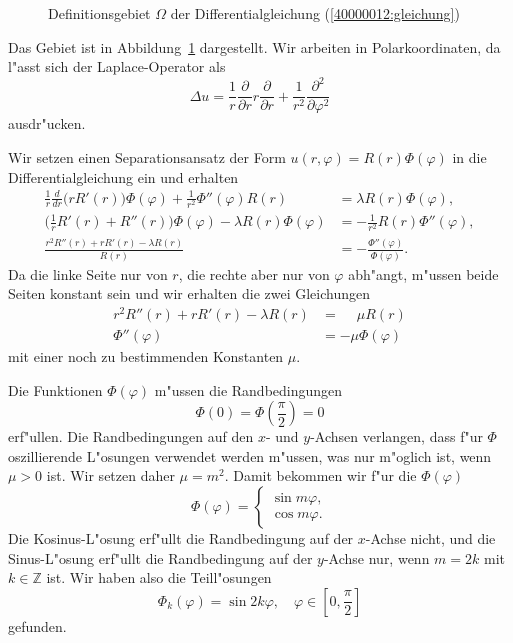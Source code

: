 \begin{loesung}
\begin{figure}
\centering
{}
\caption{Definitionsgebiet $\Omega$ der Differentialgleichung
(\ref{40000012:gleichung})
\label{40000012:gebiet}
}
\end{figure}
Das Gebiet ist in Abbildung~\ref{40000012:gebiet} dargestellt.
Wir arbeiten in Polarkoordinaten, da l"asst sich der Laplace-Operator als
\[
\Delta u
=
\frac1r\frac{\partial}{\partial r}r\frac{\partial}{\partial r}
+
\frac1{r^2}
\frac{\partial^2}{\partial\varphi^2}
\]
ausdr"ucken.
\begin{teilaufgaben}
\item
Wir setzen einen Separationsansatz der Form $u(r,\varphi)=R(r)\Phi(\varphi)$
in die Differentialgleichung ein und erhalten
\begin{align*}
\frac1r\frac{d}{dr}\bigl(rR'(r)\bigr)\Phi(\varphi)
+
\frac1{r^2}
\Phi''(\varphi)R(r)
&=
\lambda R(r)\Phi(\varphi),
\\
\biggl(\frac1rR'(r)+R''(r)\biggr)\Phi(\varphi)
- \lambda R(r)\Phi(\varphi)
&=
-
\frac1{r^2}
R(r)\Phi''(\varphi),
\\
\frac{r^2R''(r)+rR'(r)-\lambda R(r)}{R(r)}
&=
-\frac{\Phi''(\varphi)}{\Phi(\varphi)}.
\end{align*}
Da die linke Seite nur von $r$, die rechte aber nur von $\varphi$ abh"angt,
m"ussen beide Seiten konstant sein und wir
erhalten die zwei Gleichungen
\begin{align}
r^2R''(r)+rR'(r)-\lambda R(r)&=\phantom{-}\mu R(r)
\label{40000012:erste}
\\
\Phi''(\varphi)&=-\mu\Phi(\varphi)
\label{40000012:zweite}
\end{align}
mit einer noch zu bestimmenden Konstanten $\mu$.
\item
Die Funktionen $\Phi(\varphi)$ m"ussen die Randbedingungen
\[
\Phi(0)=\Phi({\textstyle\frac{\pi}2})=0
\]
erf"ullen.
Die Randbedingungen auf den $x$- und $y$-Achsen verlangen, dass f"ur $\Phi$
oszillierende L"osungen verwendet werden m"ussen, was nur m"oglich ist,
wenn $\mu>0$ ist. Wir setzen daher $\mu=m^2$. Damit bekommen wir f"ur die
$\Phi(\varphi)$
\[
\Phi(\varphi)=\begin{cases}\sin m\varphi,\\\cos m\varphi.\end{cases}
\]
Die Kosinus-L"osung erf"ullt die Randbedingung auf der $x$-Achse nicht,
und die Sinus-L"osung erf"ullt die Randbedingung auf der $y$-Achse nur,
wenn $m=2k$ mit $k\in\mathbb Z$ ist.
Wir haben also die Teill"osungen
\[
\Phi_k(\varphi)=\sin 2k\varphi, \quad\varphi\in[0,{\textstyle \frac{\pi}2}]
\]
gefunden.


\end{teilaufgaben}
\end{loesung}
